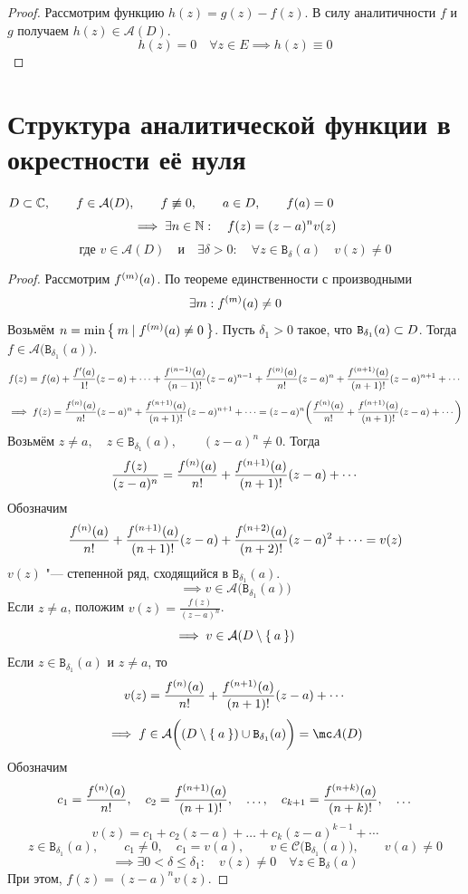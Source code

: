 \begin{proof}
	Рассмотрим функцию $ h(z) = g(z) - f(z) $. В силу аналитичности $ f $ и $ g $ получаем $h(z) \in \mathcal A(D) $.
	$$ h(z) = 0 \quad \forall z \in E \implies h(z) \equiv 0 $$
\end{proof}

\section{Структура аналитической функции в окрестности её нуля}

\begin{theorem}
	$ D \sub \Co, \qquad f \in \mathcal A(D), \qquad f \not\equiv 0, \qquad a \in D, \qquad f(a) = 0 $
	$$ \implies \exists n \in \N : \quad f(z) = (z - a)^n v(z) $$
	$$ \text{где } v \in \mathcal A(D) \quad \text{и} \quad \exists \delta > 0 : \quad \forall z \in \mathtt B_\delta(a) \quad v(z) \ne 0 $$
\end{theorem}

\begin{proof}
	Рассмотрим $ \nder[m]f(a) $. По теореме единственности с производными
	$$ \exists m : \nder[m]f(a) \ne 0 $$
	Возьмём $ n = \min \set{m \mid \nder[m]f(a) \ne 0} $. Пусть $ \delta_1 > 0 $ такое, что $ \mathtt B_{\delta_1}(a) \sub D $. Тогда $ f \in \mathcal A \big( \mathtt B_{\delta_1}(a) \big) $.
	$$ f(z) = f(a) + \frac{f'(a)}{1!}(z - a) + \dots + \frac{\nder[n - 1]f(a)}{(n - 1)!}(z - a)^{n - 1} + \frac{\nder f(a)}{n!}(z - a)^n + \frac{\nder[n + 1]f(a)}{(n + 1)!}(z - a)^{n + 1} + \cdots $$
	$$ \implies f(z) = \frac{\nder f(a)}{n!}(z - a)^n + \frac{\nder[n + 1]f(a)}{(n + 1)!}(z - a)^{n + 1} + \cdots = (z - a)^n \bigg( \frac{\nder f(a)}{n!} + \frac{\nder[n + 1]f(a)}{(n + 1)!}(z - a) + \cdots \bigg) $$
	Возьмём $ z \ne a, \quad z \in \mathtt B_{\delta_1}(a), \qquad (z - a)^n \ne 0 $. Тогда
	$$ \frac{f(z)}{(z - a)^n} = \frac{\nder f(a)}{n!} + \frac{\nder[n + 1]f(a)}{(n + 1)!}(z - a) + \cdots $$
	Обозначим
	$$ \frac{\nder f(a)}{n!} + \frac{\nder[n + 1]f(a)}{(n + 1)!}(z - a) + \frac{\nder[n + 2]f(a)}{(n + 2)!}(z - a)^2 + \dots = v(z) $$
	$ v(z) $ "--- степенной ряд, сходящийся в $ \mathtt B_{\delta_1}(a) $.
	$$ \implies v \in \mathcal A \big( \mathtt B_{\delta_1}(a) \big) $$
	Если $ z \ne a $, положим $ v(z) = \frac{f(z)}{(z - a)^n} $.
	$$ \implies v \in \mathcal A(D \setminus \set a) $$
	Если $ z \in \mathtt B_{\delta_1}(a) $ и $ z \ne a $, то
	$$ v(z) = \frac{\nder f(a)}{n!} + \frac{\nder[n + 1]f(a)}{(n + 1)!}(z - a) + \cdots $$
	$$ \implies f \in \mathcal A \bigg( (D \setminus \set a) \cup \mathtt B_{\delta_1}(a) \bigg) = \mc A(D) $$
	Обозначим
	$$ c_1 = \frac{\nder f(a)}{n!}, \quad c_2 = \frac{\nder[n + 1]f(a)}{(n + 1)!}, \quad \dots, \quad c_{k + 1} = \frac{\nder[n + k]f(a)}{(n + k)!}, \quad \dots $$
	$$ v(z) = c_1 + c_2(z - a) + \dots + c_k(z - a)^{k - 1} + \cdots $$
	$$ z \in \mathtt B_{\delta_1}(a), \qquad c_1 \ne 0, \quad c_1 = v(a), \qquad v \in \mathcal C \big( \mathtt B_{\delta_1}(a) \big), \qquad v(a) \ne 0 $$
	$$ \implies \exists 0 < \delta \le \delta_1 : \quad v(z) \ne 0 \quad \forall z \in \mathtt B_\delta(a) $$
	При этом, $ f(z) = (z - a)^nv(z) $.
\end{proof}


